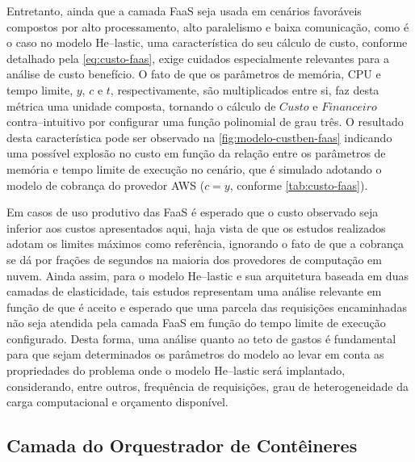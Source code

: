 \documentclass[english,brazilian]{UNISINOSmonografia} %
\begin{document}
Entretanto, ainda que a camada FaaS seja usada em cenários favoráveis compostos por alto processamento, alto paralelismo e baixa comunicação, como é o caso no modelo \textsf{He}--lastic, uma característica do seu cálculo de custo, conforme detalhado pela \autoref{eq:custo-faas}, exige cuidados especialmente relevantes para a análise de custo benefício.
O fato de que os parâmetros de memória, CPU e tempo limite, $y$, $c$ e $t$, respectivamente, são multiplicados entre si, faz desta métrica uma unidade composta, tornando o cálculo de $ Custo $ e $ Financeiro $ contra--intuitivo por configurar uma função polinomial de grau três.
O resultado desta característica pode ser observado na \autoref{fig:modelo-custben-faas} indicando uma possível explosão no custo em função da relação entre os parâmetros de memória e tempo limite de execução no cenário, que é simulado adotando o modelo de cobrança do provedor AWS ($ c = y $, conforme \autoref{tab:custo-faas}).



Em casos de uso produtivo das FaaS é esperado que o custo observado seja inferior aos custos apresentados aqui, haja vista de que os estudos realizados adotam os limites máximos como referência, ignorando o fato de que a cobrança se dá por frações de segundos na maioria dos provedores de computação em nuvem.
Ainda assim, para o modelo \textsf{He}--lastic e sua arquitetura baseada em duas camadas de elasticidade, tais estudos representam uma análise relevante em função de que é aceito e esperado que uma parcela das requisições encaminhadas não seja atendida pela camada FaaS em função do tempo limite de execução configurado.
Desta forma, uma análise quanto ao teto de gastos é fundamental para que sejam determinados os parâmetros do modelo ao levar em conta as propriedades do problema onde o modelo \textsf{He}--lastic será implantado, considerando, entre outros, frequência de requisições, grau de heterogeneidade da carga computacional e orçamento disponível.






\subsection{Camada do Orquestrador de Contêineres}
\end{document}
